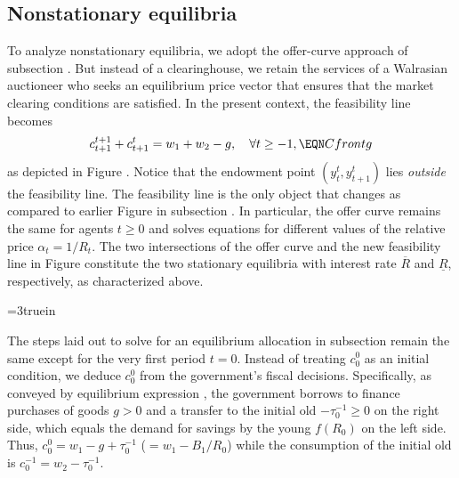 \subsection{Nonstationary equilibria}\label{sec:DefBnonstat}%
To analyze nonstationary equilibria, we adopt the offer-curve 
approach of subsection . But instead of
a clearinghouse, we retain the services of  a Walrasian auctioneer
who seeks an equilibrium price vector that ensures that the market 
clearing conditions  are satisfied. In the
present context, the feasibility line 
becomes
$$c_{t+1}^{t+1} + c_{t+1}^t 
     = w_1 + w_2 -g , \quad \forall t \geq -1,   \EQN Cfrontg
$$
as depicted in Figure . Notice that the endowment point 
$(y^t_t, y^t_{t+1})$ lies {\it outside} the feasibility line.
The feasibility line 
is the only object that changes as compared to earlier 
Figure  in subsection . In 
particular, the offer curve remains the same for agents $t\geq 0$ 
and solves equations  for different values of
the relative price $\alpha_t = 1/ R_t$. The two intersections
of the offer curve and the new feasibility line in 
Figure  constitute the two stationary equilibria 
with interest rate $\overline R$ and $\underline R$, respectively,
as characterized above.


\centerline{\epsfxsize=3truein}
\caption{Equilibria with debt- or money-financed government deficit finance.}
\endfigure

The steps laid out to solve for an equilibrium
allocation in subsection  remain
the same except for the very first period $t=0$.
Instead of treating $c^0_0$ as an initial condition,
we deduce $c^0_0$ from the government's fiscal decisions.
Specifically, as conveyed by  
equilibrium expression ,  
the government borrows to finance purchases of 
goods $g>0$ and a transfer to the initial old  
$-\tau^{-1}_0\geq 0$ on the right side, which equals
the demand for savings by the young $f(R_0)$
on the left side. Thus, 
$c^0_0 = w_1 -g + \tau^{-1}_0$ ($=w_1 - B_1/R_0$)
while the consumption of the initial old
is $c^{-1}_0 = w_2 - \tau^{-1}_0$.

